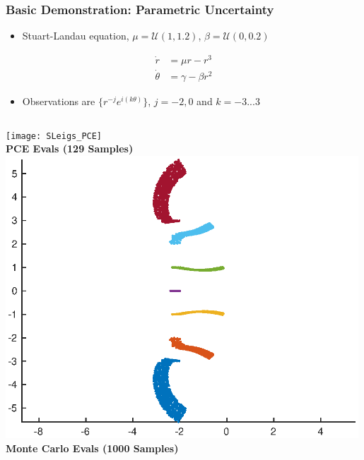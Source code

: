 \documentclass[9pt]{beamer}
\begin{document}
\begin{frame}
\frametitle{Basic Demonstration: Parametric Uncertainty}
\label{sec-4-2}

\begin{itemize}
\item Stuart-Landau equation, $\mu = \mathcal{U}(1,1.2)$, $\beta = \mathcal{U}(0,0.2)$
\end{itemize}
\begin{equation*}
\begin{aligned}
\dot{r} &= \mu r - r^3 \\
\dot{\theta} &= \gamma - \beta r^2
\end{aligned}
\end{equation*}
\begin{itemize}
\item Observations are $\lbrace r^{-j} e^{i(k\theta)} \rbrace$, $j = -2,0$ and $k = -3...3$
\end{itemize}

\begin{columns}[c]
    \centering
    \texttt{[image: SLeigs\_PCE]} \\
    {\bf PCE Evals (129 Samples)}
    \centering
    \includegraphics[width=0.99\textwidth]{SLeigs_MC} \\
    {\bf Monte Carlo Evals (1000 Samples)}
\end{columns}
\end{frame}
\end{document}
